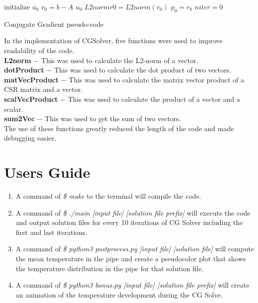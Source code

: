 \documentclass{article}
\begin{document}
\begin{algorithm}[h]
 \SetAlgoLined
 initialize $u_0$\;
 $r_0 = b - A$ $u_0$\;
 $L2normr0 = L2norm(r_0)$\;
 $p_0 = r_0$\;
 $niter = 0$\;
 \caption{Conjugate Gradient pseudo-code}
\end{algorithm}
In the implementation of CGSolver, five functions were used to improve readability
of the code.\\
\textbf{L2norm} $-$ This was used to calculate the L2-norm of a vector.\\
\textbf{dotProduct} $-$ This was used to calculate the dot product of two vectors.\\
\textbf{matVecProduct} $-$ This was used to calculate the matrix vector product of a
CSR matrix and a vector.\\
\textbf{scalVecProduct} $-$ This was used to calculate the product of a vector and a
scalar.\\
\textbf{sum2Vec} $-$ This was used to get the sum of two vectors.\\
The use of these functions greatly reduced the length of the code and made
debugging easier.

\section{Users Guide}
\begin{enumerate}
\item A command of \emph{\$ make} to the terminal will compile the code.
\item A command of \emph{\$ ./main [input file] [solution file prefix]} will execute
the code and output solution files for every 10 iterations of CG Solver including the
first and last iterations.
\item A command of \emph{\$ python3 postprocess.py [input file] [solution file]} will
compute the mean temperature in the pipe and create a pseudocolor plot that shows
the temperature distribution in the pipe for that solution file.
\item A command of \emph{\$ python3 bonus.py [input file] [solution file prefix]} will
create an animation of the temperature development during the CG Solve.
\end{enumerate}
\end{document}
